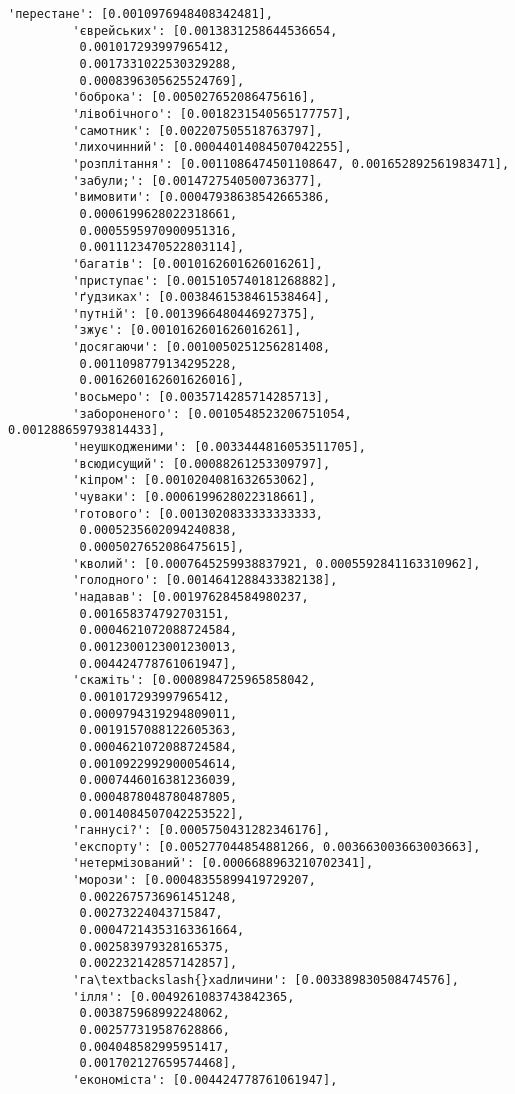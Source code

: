 \documentclass[11pt]{article}
\begin{document}
\begin{Verbatim}[commandchars=\\\{\}]
         'перестане': [0.0010976948408342481],
         'єврейських': [0.0013831258644536654,
          0.001017293997965412,
          0.0017331022530329288,
          0.0008396305625524769],
         'боброка': [0.005027652086475616],
         'лівобічного': [0.0018231540565177757],
         'самотник': [0.002207505518763797],
         'лихочинний': [0.00044014084507042255],
         'розплітання': [0.0011086474501108647, 0.001652892561983471],
         'забули;': [0.0014727540500736377],
         'вимовити': [0.00047938638542665386,
          0.0006199628022318661,
          0.0005595970900951316,
          0.0011123470522803114],
         'багатів': [0.0010162601626016261],
         'приступає': [0.0015105740181268882],
         'ґудзиках': [0.0038461538461538464],
         'путній': [0.0013966480446927375],
         'зжує': [0.0010162601626016261],
         'досягаючи': [0.0010050251256281408,
          0.0011098779134295228,
          0.0016260162601626016],
         'восьмеро': [0.0035714285714285713],
         'забороненого': [0.0010548523206751054, 0.001288659793814433],
         'неушкодженими': [0.0033444816053511705],
         'всюдисущий': [0.00088261253309797],
         'кіпром': [0.0010204081632653062],
         'чуваки': [0.0006199628022318661],
         'готового': [0.0013020833333333333,
          0.0005235602094240838,
          0.0005027652086475615],
         'кволий': [0.0007645259938837921, 0.0005592841163310962],
         'голодного': [0.0014641288433382138],
         'надавав': [0.001976284584980237,
          0.001658374792703151,
          0.0004621072088724584,
          0.0012300123001230013,
          0.004424778761061947],
         'скажіть': [0.0008984725965858042,
          0.001017293997965412,
          0.0009794319294809011,
          0.0019157088122605363,
          0.0004621072088724584,
          0.0010922992900054614,
          0.0007446016381236039,
          0.0004878048780487805,
          0.0014084507042253522],
         'ганнусі?': [0.0005750431282346176],
         'експорту': [0.005277044854881266, 0.003663003663003663],
         'нетермізований': [0.0006688963210702341],
         'морози': [0.00048355899419729207,
          0.0022675736961451248,
          0.00273224043715847,
          0.00047214353163361664,
          0.002583979328165375,
          0.002232142857142857],
         'га\textbackslash{}xadличини': [0.003389830508474576],
         'ілля': [0.0049261083743842365,
          0.003875968992248062,
          0.002577319587628866,
          0.004048582995951417,
          0.001702127659574468],
         'економіста': [0.004424778761061947],

\end{Verbatim}
\end{document}
